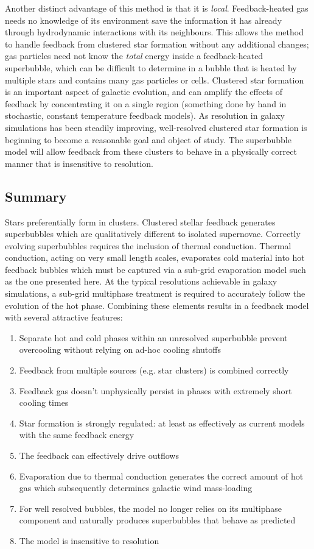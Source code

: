 Another distinct advantage of this method is that it is {\it local}.
Feedback-heated gas needs no knowledge of its environment save the information
it has already through hydrodynamic interactions with its neighbours.  This
allows the method to handle feedback from clustered star formation without any
additional changes; gas particles need not know the {\it total} energy inside
a feedback-heated superbubble, which can be difficult to determine in a bubble
that is heated by multiple stars and contains many gas particles or cells.
Clustered star formation is an important aspect of galactic evolution, and can
amplify the effects of feedback by concentrating it on a single region
(something done by hand in stochastic, constant temperature feedback models).
As resolution in galaxy simulations has been steadily improving, well-resolved
clustered star formation is beginning to become a reasonable goal and object of
study.  The superbubble model will allow feedback from these clusters to behave
in a physically correct manner that is insensitive to resolution.

\subsection{Summary}
Stars preferentially form in clusters.  Clustered stellar feedback generates
superbubbles which are qualitatively different to isolated supernovae.
Correctly evolving superbubbles requires the inclusion of thermal conduction.
Thermal conduction, acting on very small length scales, evaporates cold material
into hot feedback bubbles which must be captured via a sub-grid evaporation
model such as the one presented here.  At the typical resolutions achievable in
galaxy simulations, a sub-grid multiphase treatment is required to accurately
follow the evolution of the hot phase.  Combining these elements results in a
feedback model with several attractive features:

\begin{enumerate}
    \item Separate hot and cold phases within an unresolved superbubble prevent overcooling
        without relying on ad-hoc cooling shutoffs
    \item Feedback from multiple sources (e.g. star clusters) is combined correctly
    \item Feedback gas doesn't unphysically persist in phases with extremely short cooling times
    \item Star formation is strongly regulated: at least as effectively as current models with the same
           feedback energy
    \item The feedback can effectively drive outflows
    \item Evaporation due to thermal conduction
        generates the correct amount of hot gas which 
        subsequently determines galactic wind mass-loading
    \item For well resolved bubbles, the model no longer relies on its multiphase component 
         and naturally produces superbubbles that behave as predicted
    \item The model is insensitive to resolution
\end{enumerate}

